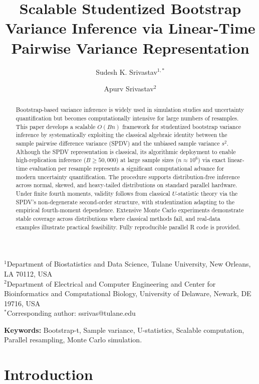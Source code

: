 \documentclass[12pt,a4paper]{article}
\begin{document}
\title{Scalable Studentized Bootstrap Variance Inference via Linear-Time Pairwise Variance Representation}
\author{Sudesh K. Srivastav$^{1,\ast}$ \and Apurv Srivastav$^{2}$}
\date{}
\maketitle
\begin{center}
$^{1}$Department of Biostatistics and Data Science, Tulane University, New Orleans, LA 70112, USA \\
$^{2}$Department of Electrical and Computer Engineering and Center for Bioinformatics and Computational Biology, University of Delaware, Newark, DE 19716, USA \\
$^\ast$Corresponding author: ssrivas@tulane.edu
\end{center}
\begin{abstract}
Bootstrap-based variance inference is widely used in simulation studies and uncertainty quantification but becomes computationally intensive for large numbers of resamples. This paper develops a scalable $O(Bn)$ framework for studentized bootstrap variance inference by systematically exploiting the classical algebraic identity between the sample pairwise difference variance (SPDV) and the unbiased sample variance $s^2$. Although the SPDV representation is classical, its algorithmic deployment to enable high-replication inference ($B\ge50{,}000$) at large sample sizes ($n\approx10^6$) via exact linear-time evaluation per resample represents a significant computational advance for modern uncertainty quantification. The procedure supports distribution-free inference across normal, skewed, and heavy-tailed distributions on standard parallel hardware. Under finite fourth moments, validity follows from classical $U$-statistic theory via the SPDV's non-degenerate second-order structure, with studentization adapting to the empirical fourth-moment dependence. Extensive Monte Carlo experiments demonstrate stable coverage across distributions where classical methods fail, and real-data examples illustrate practical feasibility. Fully reproducible parallel \textsf{R} code is provided.
\end{abstract}
\noindent \textbf{Keywords:} Bootstrap-t, Sample variance, U-statistics, Scalable computation, Parallel resampling, Monte Carlo simulation.

\section{Introduction}\label{sec:intro}
\end{document}
